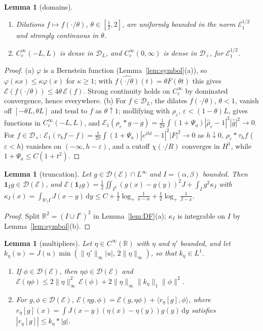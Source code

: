\documentclass[11pt]{amsart}
\newcommand{\R}{\mathbb{R}}
\newcommand{\cE}{\mathcal{E}}
\newcommand{\one}{\mathbf{1}}
\newcommand{\dd}{\,\mathrm{d}}
\newcommand{\eps}{\varepsilon}
\newtheorem{lemma}[theorem]{Lemma}
\theoremstyle{definition}
\theoremstyle{remark}
\numberwithin{equation}{section}
\begin{document}
\begin{lemma}[domains]\label{lem:domains}
\begin{enumerate}
\item[(a)] Dilations $f\mapsto f(\cdot/\theta)$, $\theta\in[\frac12,2]$, are uniformly bounded in the norm $\cE_1^{1/2}$ and strongly continuous in $\theta$.
\item[(b)] $C_c^\infty(-L,L)$ is dense in $\mathcal D_L$, and $C_c^\infty(0,\infty)$ is dense in $\mathcal D_+$, for $\cE_1^{1/2}$.
\end{enumerate}
\end{lemma}

\begin{proof}
(a) $\varphi$ is a Bernstein function (Lemma~\ref{lem:symbol}(a)), so $\varphi(\kappa x)\le\kappa\varphi(x)$ for $\kappa\ge1$; with $\widehat{f(\cdot/\theta)}(t)=\theta F(\theta t)$ this gives $\cE(f(\cdot/\theta))\le4\theta\,\cE(f)$. Strong continuity holds on $C_c^\infty$ by dominated convergence, hence everywhere. (b) For $f\in \mathcal D_L$, the dilates $f(\cdot/\theta)$, $\theta<1$, vanish off $[-\theta L,\theta L]$ and tend to $f$ as $\theta\uparrow1$; mollifying with $\rho_\eps$, $\eps<(1-\theta)L$, gives functions in $C_c^\infty(-L,L)$, and $\cE_1(\rho_\eps*g-g)=\frac1{2\pi}\int(1+\Psi_a)|\hat\rho_\eps-1|^2|\hat g|^2\to0$. For $f\in \mathcal D_+$: $\cE_1(\tau_hf-f)=\frac1{2\pi}\int(1+\Psi_a)|e^{iht}-1|^2|F|^2\to0$ as $h\downarrow0$, $\rho_\eps*\tau_hf$ ($\eps<h$) vanishes on $(-\infty,h-\eps)$, and a cutoff $\chi(\cdot/R)$ converges in $H^1$, while $1+\Psi_a\le C(1+t^2)$.
\end{proof}

\begin{lemma}[truncation]\label{lem:trunc}
Let $g\in \mathcal D(\cE)\cap L^\infty$ and $I=(\alpha,\beta)$ bounded. Then $\one_Ig\in \mathcal D(\cE)$, and $\cE(\one_Ig)=\frac12\iint_{I^2}(g(x)-g(y))^2J+\int_Ig^2\kappa_I$ with $\kappa_I(x)=\int_{\R\setminus I}J(x-y)\dd y\le C+\frac12\log_+\frac1{x-\alpha}+\frac12\log_+\frac1{\beta-x}$.
\end{lemma}

\begin{proof}
Split $\R^2=(I\cup I^c)^2$ in Lemma~\ref{lem:DF}(a); $\kappa_I$ is integrable on $I$ by Lemma~\ref{lem:symbol}(b).
\end{proof}

\begin{lemma}[multipliers]\label{lem:mult}
Let $\eta\in C^\infty(\R)$ with $\eta$ and $\eta'$ bounded, and let $k_\eta(u)=J(u)\min(\|\eta'\|_\infty|u|,\,2\|\eta\|_\infty)$, so that $k_\eta\in L^1$.
\begin{enumerate}
\item[(a)] If $\phi\in \mathcal D(\cE)$, then $\eta\phi\in \mathcal D(\cE)$ and $\cE(\eta\phi)\le2\|\eta\|_\infty^2\,\cE(\phi)+2\|\eta\|_\infty\|k_\eta\|_1\|\phi\|^2$.
\item[(b)] For $g,\phi\in \mathcal D(\cE)$, $\cE(\eta g,\phi)=\cE(g,\eta\phi)+\langle r_\eta[g],\phi\rangle$, where $r_\eta[g](x)=\int J(x-y)(\eta(x)-\eta(y))g(y)\dd y$ satisfies $|r_\eta[g]|\le k_\eta*|g|$.
\end{enumerate}
\end{lemma}
\end{document}
